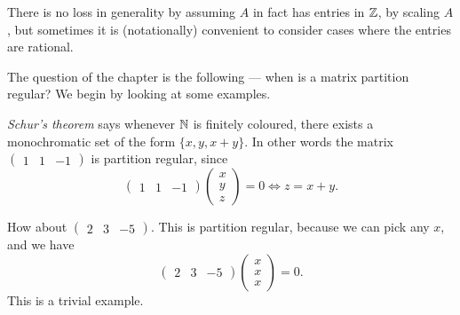 \documentclass[a4paper]{article}
\begin{document}
There is no loss in generality by assuming $A$ in fact has entries in $\mathbb{Z}$, by scaling $A$, but sometimes it is (notationally) convenient to consider cases where the entries are rational.

The question of the chapter is the following --- when is a matrix partition regular? We begin by looking at some examples.
\begin{eg}
  \emph{Schur's theorem} says whenever $\mathbb{N}$ is finitely coloured, there exists a monochromatic set of the form $\{x, y, x + y\}$. In other words the matrix $\begin{pmatrix}1 & 1 & -1\end{pmatrix}$ is partition regular, since
  \[
    \begin{pmatrix}
      1 & 1 & -1
    \end{pmatrix}
    \begin{pmatrix}
      x\\y\\z
    \end{pmatrix} = 0 \Longleftrightarrow z = x + y.
  \]
\end{eg}

\begin{eg}
  How about $\begin{pmatrix}2 & 3 & -5\end{pmatrix}$. This is partition regular, because we can pick any $x$, and we have
  \[
    \begin{pmatrix}
      2 & 3 & -5
    \end{pmatrix}
    \begin{pmatrix}
      x\\x\\x
    \end{pmatrix} = 0.
  \]
  This is a trivial example.
\end{eg}
\end{document}
